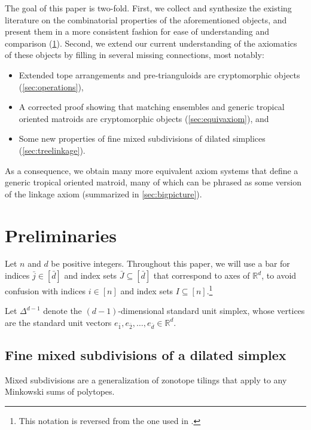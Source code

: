 \documentclass[letterpaper,reqno,11pt]{amsart}
\begin{document}
The goal of this paper is two-fold. First, we collect and synthesize the existing literature on the combinatorial properties of the aforementioned objects, and present them in a more consistent fashion for ease of understanding and comparison (\cref{sec:prelim}). Second, we extend our current understanding of the axiomatics of these objects by filling in several missing connections, most notably: \begin{itemize}
    \item Extended tope arrangements and pre-trianguloids are cryptomorphic objects (\cref{sec:operations}),
    \item A corrected proof showing that matching ensembles and generic tropical oriented matroids are cryptomorphic objects (\cref{sec:equivaxiom}), and
    \item Some new properties of fine mixed subdivisions of dilated simplices (\cref{sec:treelinkage}).
\end{itemize}
As a consequence, we obtain many more equivalent axiom systems that define a generic tropical oriented matroid, many of which can be phrased as some version of the linkage axiom (summarized in \cref{sec:bigpicture}).

\section{Preliminaries}\label{sec:prelim}


Let $n$ and $d$ be positive integers. Throughout this paper, we will use a bar for indices $\bar{j} \in [\bar{d}]$ and index sets $\bar{J}\subseteq [\bar{d}]$ that correspond to axes of $\mathbb{R}^d$, to avoid confusion with indices $i\in [n]$ and index sets $I\subseteq [n]$.\footnote{This notation is reversed from the one used in \cite{Trianguloids}.}

Let $\Delta^{d-1}$ denote the $(d-1)$-dimensional standard unit simplex, whose vertices are the standard unit vectors $e_{\bar{1}}, e_{\bar{2}}, \dots, e_{\bar{d}} \in \mathbb{R}^d$. 

\subsection{Fine mixed subdivisions of a dilated simplex}

Mixed subdivisions are a generalization of zonotope tilings that apply to any Minkowski sums of polytopes.
\end{document}
